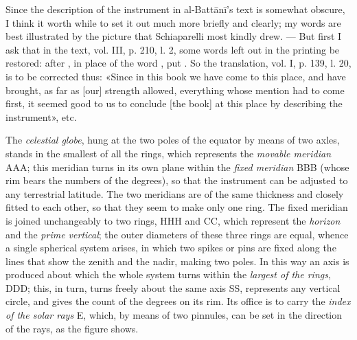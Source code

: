 \documentclass[11pt]{article}
\newcommand{\Pg}[1]{\marginpar{\footnotesize\color{gray}#1}}
\begin{document}
\begin{center}\end{center}
\par \Pg{I 321}Since the description of the instrument in al-Battānī's text is somewhat obscure, I think it worth while to set it out much more briefly and clearly; my words are best illustrated by the picture that Schiaparelli most kindly drew. — But first I ask that in the text, vol. III, p. 210, l. 2, some words left out in the printing be restored: after , in place of the word , put . So the translation, vol. I, p. 139, l. 20, is to be corrected thus: «Since in this book we have come to this place, and have brought, as far as [our] strength allowed, everything whose mention had to come first, it seemed good to us to conclude [the book] at this place by describing the instrument», etc.\par
\par The \emph{celestial globe}, hung at the two poles of the equator by means of two axles, stands in the smallest of all the rings, which represents the \emph{movable meridian} AAA; this meridian turns in its own plane within the \emph{fixed meridian} BBB (whose rim bears the numbers of the degrees), so that the instrument can be adjusted to any terrestrial latitude. The two meridians are of the same thickness and closely fitted to each other, so that they seem to make only one ring. The fixed meridian is joined unchangeably to two rings, HHH and CC, which represent the \emph{horizon} and the \emph{prime vertical}; the outer diameters of these three rings are equal, whence a single spherical system arises, in which two spikes or pins are fixed along the lines that show the zenith and the nadir, making two poles. In this way an axis is produced about which the whole system turns within the \emph{largest of the rings}, DDD; this, in turn, turns freely about the same axis SS, represents any vertical circle, and gives the count of the degrees on its rim. Its office is to carry the \emph{index of the solar rays} E, which, by means of two pinnules, can be set in the direction of the rays, as the figure shows.\par
\end{document}
